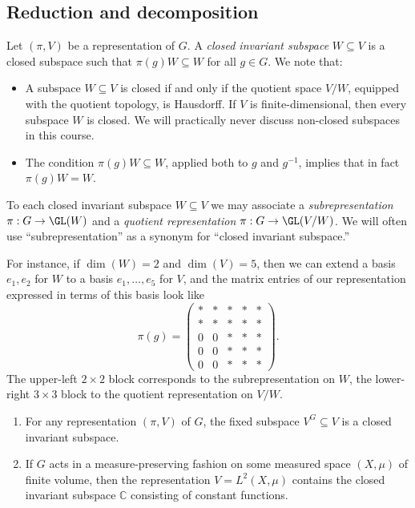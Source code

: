 \documentclass[reqno]{amsart} 
\begin{document}
\subsection{Reduction and decomposition}\label{sec:cnh2vn9dp5}
\begin{definition}
  Let $(\pi,V)$ be a representation of $G$.  A \emph{closed invariant subspace} $W \subseteq V$ is a closed subspace such that $\pi(g) W \subseteq W$ for all $g \in G$.  We note that:
  \begin{itemize}
  \item A subspace $W \subseteq V$ is closed if and only if the quotient space $V/W$, equipped with the quotient topology, is Hausdorff.  If $V$ is finite-dimensional, then every subspace $W$ is closed.  We will practically never discuss non-closed subspaces in this course.
  \item The condition $\pi(g) W \subseteq W$, applied both to $g$ and $g^{-1}$, implies that in fact $\pi(g) W = W$.
  \end{itemize}
  To each closed invariant subspace $W \subseteq V$ we may associate a \emph{subrepresentation} $\pi : G \rightarrow \GL(W)$ and a \emph{quotient representation} $\pi : G \rightarrow \GL(V/W)$.  We will often use ``subrepresentation'' as a synonym for ``closed invariant subspace.''
\end{definition}
For instance, if $\dim(W) = 2$ and $\dim(V) = 5$, then we can extend a basis $e_1,e_2$ for $W$ to a basis $e_1,\dotsc,e_5$ for $V$, and the matrix entries of our representation expressed in terms of this basis look like
\begin{equation*}
  \pi(g) =
  \begin{pmatrix}
    \ast & \ast & \ast & \ast & \ast \\
    \ast & \ast & \ast & \ast & \ast \\
    0 & 0 & \ast & \ast & \ast \\
    0 & 0 & \ast & \ast & \ast \\
    0 & 0 & \ast & \ast & \ast
  \end{pmatrix}
.
\end{equation*}
The upper-left $2 \times 2$ block corresponds to the subrepresentation on $W$, the lower-right $3 \times 3$ block to the quotient representation on $V/W$.

\begin{example}
  \begin{enumerate}
  \item For any representation $(\pi,V)$ of $G$, the fixed subspace $V^G \subseteq V$ is a closed invariant subspace.
  \item If $G$ acts in a measure-preserving fashion on some measured space $(X,\mu)$ of finite volume, then the representation $V = L^2(X,\mu)$ contains the closed invariant subspace $\mathbb{C}$ consisting of constant functions.
  \end{enumerate}
\end{example}
\end{document}
